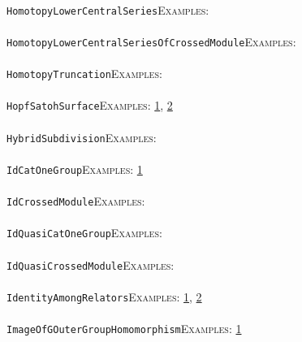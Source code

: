 \documentclass[a4paper,11pt]{report}
\begin{document}
{{ \\
 \texttt{HomotopyLowerCentralSeries}{\nobreakspace}{\nobreakspace}{\nobreakspace}{\nobreakspace}\textsc{Examples:} \\
 \\
 \texttt{HomotopyLowerCentralSeriesOfCrossedModule}{\nobreakspace}{\nobreakspace}{\nobreakspace}{\nobreakspace}\textsc{Examples:} \\
 \\
 \texttt{HomotopyTruncation}{\nobreakspace}{\nobreakspace}{\nobreakspace}{\nobreakspace}\textsc{Examples:} \\
 \\
 \texttt{HopfSatohSurface}{\nobreakspace}{\nobreakspace}{\nobreakspace}{\nobreakspace}\textsc{Examples:} \href{tutorial/chap3.html} {1}{\nobreakspace}, \href{../www/SideLinks/About/aboutCoverinSpaces.html} {2}{\nobreakspace} \\
 \\
 \texttt{HybridSubdivision}{\nobreakspace}{\nobreakspace}{\nobreakspace}{\nobreakspace}\textsc{Examples:} \\
 \\
 \texttt{IdCatOneGroup}{\nobreakspace}{\nobreakspace}{\nobreakspace}{\nobreakspace}\textsc{Examples:} \href{../www/SideLinks/About/aboutquasi.html} {1}{\nobreakspace} \\
 \\
 \texttt{IdCrossedModule}{\nobreakspace}{\nobreakspace}{\nobreakspace}{\nobreakspace}\textsc{Examples:} \\
 \\
 \texttt{IdQuasiCatOneGroup}{\nobreakspace}{\nobreakspace}{\nobreakspace}{\nobreakspace}\textsc{Examples:} \\
 \\
 \texttt{IdQuasiCrossedModule}{\nobreakspace}{\nobreakspace}{\nobreakspace}{\nobreakspace}\textsc{Examples:} \\
 \\
 \texttt{IdentityAmongRelators}{\nobreakspace}{\nobreakspace}{\nobreakspace}{\nobreakspace}\textsc{Examples:} \href{../www/SideLinks/About/aboutPeriodic.html} {1}{\nobreakspace}, \href{../www/SideLinks/About/aboutTopology.html} {2}{\nobreakspace} \\
 \\
 \texttt{ImageOfGOuterGroupHomomorphism}{\nobreakspace}{\nobreakspace}{\nobreakspace}{\nobreakspace}\textsc{Examples:} \href{../www/SideLinks/About/aboutCoefficientSequence.html} {1}{\nobreakspace} \\
 \\
}}
\end{document}
